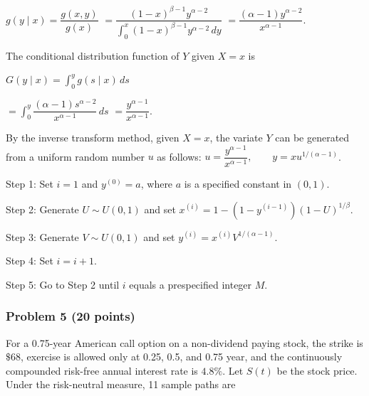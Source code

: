 $g(y\mid x)=\dfrac{g(x,y)}{g(x)}$
$=\dfrac{(1-x)^{\beta-1}y^{\alpha-2}}{\int_0^x(1-x)^{\beta-1}y^{\alpha-2}\,dy}$
$=\dfrac{(\alpha-1)y^{\alpha-2}}{x^{\alpha-1}}$.

The conditional distribution function of $Y$ given $X=x$ is

$G(y\mid x)=\int_0^yg(s\mid x)\,ds$

$=\int_0^y\dfrac{(\alpha-1)s^{\alpha-2}}{x^{\alpha-1}}\,ds$
$=\dfrac{y^{\alpha-1}}{x^{\alpha-1}}$.

By the inverse transform method, given $X=x$, the variate $Y$ can be generated from a uniform random number $u$ as follows:
$u=\dfrac{y^{\alpha-1}}{x^{\alpha-1}},\qquad y=xu^{1/(\alpha-1)}$.


Step 1: Set $i=1$ and $y^{(0)}=a$, where $a$ is a specified constant in $(0,1)$.

Step 2: Generate $U\sim U(0,1)$ and set
$x^{(i)}=1-(1-y^{(i-1)})(1-U)^{1/\beta}$.

Step 3: Generate $V\sim U(0,1)$ and set
$y^{(i)}=x^{(i)}V^{1/(\alpha-1)}$.

Step 4: Set $i=i+1$.

Step 5: Go to Step 2 until $i$ equals a prespecified integer $M$.

\subsubsection*{Problem 5 (20 points)}

 For a 0.75-year American call option on a non-dividend paying stock, the strike is $\$68$, exercise is allowed only at 0.25, 0.5, and 0.75 year, and the continuously compounded risk-free annual interest rate is $4.8\%$. Let $S(t)$ be the stock price. Under the risk-neutral measure, 11 sample paths are

\noindent{}

